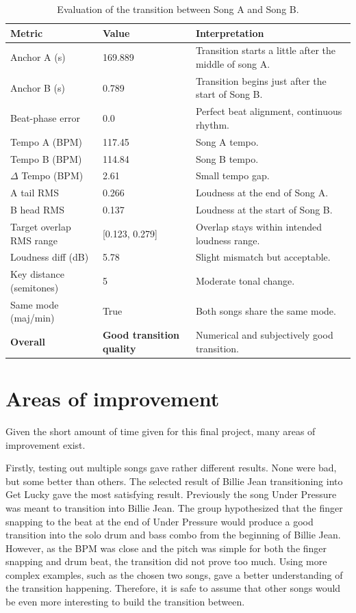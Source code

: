 \documentclass{article}
\begin{document}
\begin{table}[H]
\centering
\begin{tabular}{l l l}
\hline
\textbf{Metric} & \textbf{Value} & \textbf{Interpretation} \\
\hline
Anchor A (s) & 169.889 & Transition starts a little after the middle of song A. \\
Anchor B (s) & 0.789 & Transition begins just after the start of Song B. \\
Beat-phase error & 0.0 & Perfect beat alignment, continuous rhythm. \\
Tempo A (BPM) & 117.45 & Song A tempo. \\
Tempo B (BPM) & 114.84 & Song B tempo. \\
$\Delta$ Tempo (BPM) & 2.61 & Small tempo gap. \\
A tail RMS & 0.266 & Loudness at the end of Song A. \\
B head RMS & 0.137 & Loudness at the start of Song B. \\
Target overlap RMS range & [0.123, 0.279] & Overlap stays within intended loudness range. \\
Loudness diff (dB) & 5.78 & Slight mismatch but acceptable. \\
Key distance (semitones) & 5 & Moderate tonal change. \\
Same mode (maj/min) & True & Both songs share the same mode. \\
\hline
\textbf{Overall} & \textbf{Good transition quality} & Numerical and subjectively good transition. \\ 
\hline
\end{tabular}
\caption{Evaluation of the transition between Song A and Song B.}
\label{tab:evaluation}
\end{table}






\section{Areas of improvement}

Given the short amount of time given for this final project, many areas of improvement exist.

Firstly, testing out multiple songs gave rather different results. None were bad, but some better than others. The selected result of Billie Jean transitioning into Get Lucky gave the most satisfying result. Previously the song Under Pressure was meant to transition into Billie Jean. The group hypothesized that the finger snapping to the beat at the end of Under Pressure would produce a good transition into the solo drum and bass combo from the beginning of Billie Jean. However, as the BPM was close and the pitch was simple for  both the finger snapping and drum beat, the transition did not prove too much. Using more complex examples, such as the chosen two songs, gave a better understanding of the transition happening. Therefore, it is safe to assume that other songs would be even more interesting to build the transition between.
\end{document}
